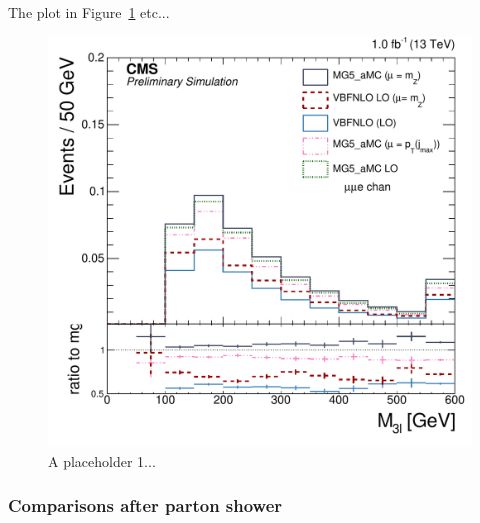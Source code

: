 \documentclass[11pt]{cernrep}
\begin{document}
The plot in Figure~\ref{vbs_fig1} etc... 

\begin{figure}[htbp]
\begin{center}
   \includegraphics[scale=0.65]{figs/3lmass.pdf}
\caption{A placeholder 1...}
\label{vbs_fig1}
\end{center}
\end{figure}

\subsubsection*{Comparisons after parton shower}
\end{document}
